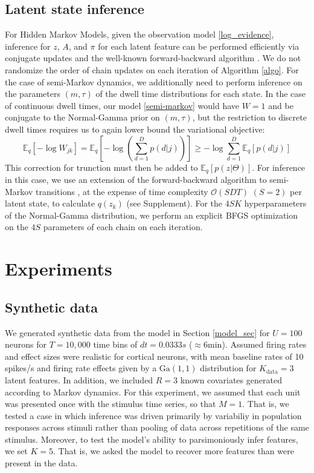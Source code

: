 \documentclass{article} %
\begin{document}
\subsection{Latent state inference}
For Hidden Markov Models, given the observation model \ref{log_evidence}, inference for $z$, $A$, and $\pi$ for each latent feature can be performed efficiently via conjugate updates and the well-known forward-backward algorithm \cite{beal2003variational}. We do not randomize the order of chain updates on each iteration of Algorithm \ref{algo}. For the case of semi-Markov dynamics, we additionally need to perform inference on the parameters $(m, \tau)$ of the dwell time distributions for each state. In the case of continuous dwell times, our model \ref{semi-markov} would have $W = 1$ and be conjugate to the Normal-Gamma prior on $(m, \tau)$, but the restriction to discrete dwell times requires us to again lower bound the variational objective:
\begin{equation}
    \mathbb{E}_q\left[-\log W_{jk} \right] = 
    \mathbb{E}_q\left[- \log \left( \sum_{d=1}^D p(d|j)\right) \right]
    \ge -\log \sum_{d = 1}^D \mathbb{E}_q\left[p(d|j)\right]
\end{equation}
This correction for trunction must then be added to $\mathbb{E}_q[p(z|\Theta)]$. For inference in this case, we use an extension of the forward-backward algorithm to semi-Markov transitions \cite{Yu2006-bb}, at the expense of time complexity $\mathcal{O}(SDT)$ $(S = 2)$ per latent state, to calculate $q(z_k)$ (see Supplement). For the $4SK$ hyperparameters of the Normal-Gamma distribution, we perform an explicit BFGS optimization on the $4S$ parameters of each chain on each iteration.

\section{Experiments}
\subsection{Synthetic data}
We generated synthetic data from the model in Section \ref{model_sec} for $U=100$ neurons for $T=10,000$ time bins of $dt=0.0333s$ ($\approx 6$min). Assumed firing rates and effect sizes were realistic for cortical neurons, with mean baseline rates of 10 spikes/s and firing rate effects given by a $\text{Ga}(1, 1)$ distribution for $K_{\text{data}}=3$ latent features. In addition, we included $R=3$ known covariates generated according to Markov dynamics. For this experiment, we assumed that each unit was presented once with the stimulus time series, so that $M = 1$. That is, we tested a case in which inference was driven primarily by variabiliy in population responses across stimuli rather than pooling of data across repetitions of the same stimulus. Moreover, to test the model's ability to parsimoniously infer features, we set $K=5$. That is, we asked the model to recover more features than were present in the data.
\end{document}
